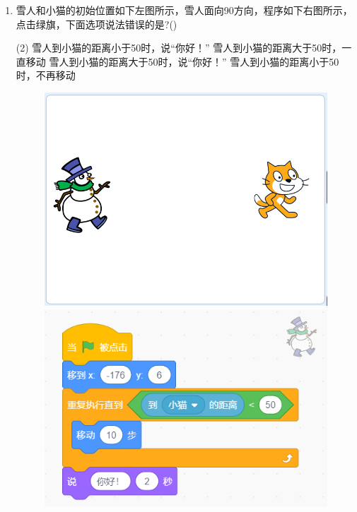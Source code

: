 \documentclass[10pt, a4paper]{article}
\begin{document}
\begin{enumerate}
        \item 雪人和小猫的初始位置如下左图所示，雪人面向90方向，程序如下右图所示，点击绿旗，下面选项说法错误的是?(\qquad)
        \begin{tasks}(2)
            \task 雪人到小猫的距离小于50时，说“你好！”
            \task 雪人到小猫的距离大于50时，一直移动
            \task 雪人到小猫的距离大于50时，说“你好！”
            \task 雪人到小猫的距离小于50时，不再移动
        \end{tasks}

        \begin{figure}[htbp]
            \centering
            \begin{minipage}[t]{.4\textwidth}
                \begin{minipage}[t]{.4\textwidth}
                    \centering
                    \includegraphics[width=\textwidth]{19-1.png}
                \end{minipage}
                \begin{minipage}[t]{.58\textwidth}
                    \centering
                    \includegraphics[width=\textwidth]{19-2.png}

\end{minipage}
\end{minipage}
\end{figure}
\end{enumerate}
\end{document}
